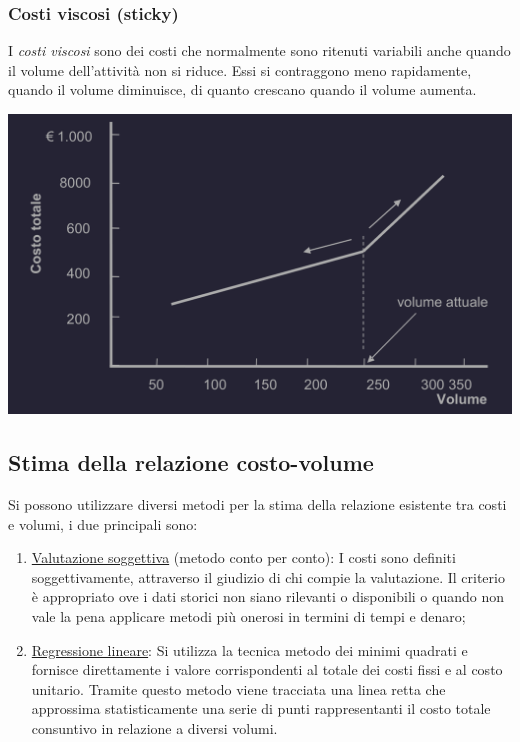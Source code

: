 \documentclass{article}
\begin{document}
\subsubsection{Costi viscosi (sticky)}
I \textit{costi viscosi} sono dei costi che normalmente sono ritenuti variabili anche quando il volume dell'attività non si riduce. Essi si contraggono meno rapidamente, quando il volume diminuisce, di quanto crescano quando il volume aumenta.
\begin{center}
    \includegraphics[scale=0.3]{Image/Costi_Viscosi_1.png}
\end{center}



\subsection{Stima della relazione costo-volume}
Si possono utilizzare diversi metodi per la stima della relazione esistente tra costi e volumi, i due principali sono:
\begin{enumerate}
    \item \underline{Valutazione soggettiva} (metodo conto per conto): I costi sono definiti soggettivamente,
    attraverso il giudizio di chi compie la valutazione. Il criterio è appropriato ove i dati storici non
    siano rilevanti o disponibili o quando non vale la pena applicare metodi più onerosi in termini
    di tempi e denaro;
    \item \underline{Regressione lineare}: Si utilizza la tecnica metodo dei minimi quadrati e fornisce direttamente i
    valore corrispondenti al totale dei costi fissi e al costo unitario. Tramite questo metodo viene
    tracciata una linea retta che approssima statisticamente una serie di punti rappresentanti il
    costo totale consuntivo in relazione a diversi volumi.
\end{enumerate}
\end{document}

